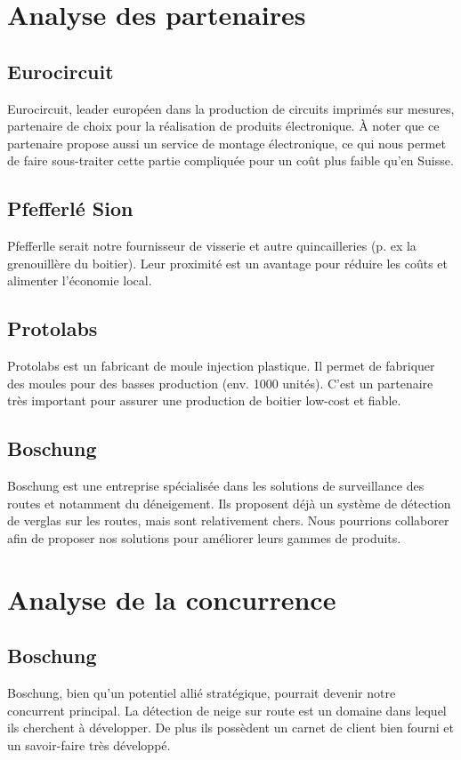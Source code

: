 \section{Analyse des partenaires}
\subsection{Eurocircuit}
Eurocircuit, leader européen dans la production de circuits imprimés sur mesures,
partenaire de choix pour la réalisation de produits électronique.
À noter que ce partenaire propose aussi un service de montage électronique,
ce qui nous permet de faire sous-traiter cette partie compliquée pour
un coût plus faible qu'en Suisse.

\subsection{Pfefferlé Sion}
Pfefferlle serait notre fournisseur de visserie et autre quincailleries (p. ex la grenouillère du boitier).
Leur proximité est un avantage pour réduire les coûts et alimenter l'économie local.

\subsection{Protolabs}
Protolabs est un fabricant de moule injection plastique. Il permet de fabriquer des
moules pour des basses production (env. 1000 unités).
C'est un partenaire très important pour assurer une production de boitier low-cost et fiable.

\subsection{Boschung}
Boschung est une entreprise spécialisée dans les solutions de surveillance des routes et
notamment du déneigement. Ils proposent déjà un système de détection de verglas
sur les routes, mais sont relativement chers. Nous pourrions collaborer
afin de proposer nos solutions pour améliorer leurs gammes de produits.

\section{Analyse de la concurrence}
\subsection{Boschung}
Boschung, bien qu'un potentiel allié stratégique, pourrait devenir notre concurrent
principal. La détection de neige sur route est un domaine dans lequel ils cherchent à
développer. De plus ils possèdent un carnet de client bien fourni et un savoir-faire
très développé.

